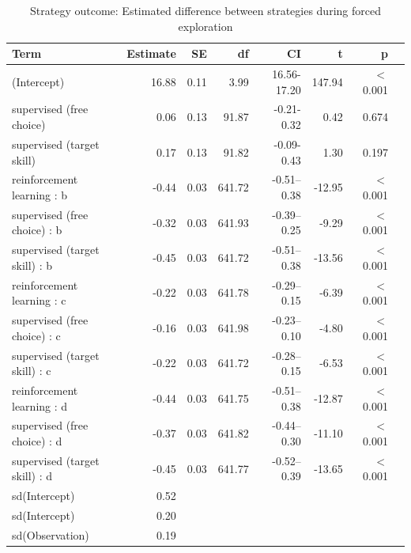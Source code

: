 \documentclass[pdflatex,sn-mathphys-num]{sn-jnl}%
\theoremstyle{thmstyleone}%
\theoremstyle{thmstyletwo}%
\theoremstyle{thmstylethree}%
\begin{document}
\begin{appendices}
\begin{table}[h!]
\caption{Strategy outcome: Estimated difference between strategies during forced exploration}\label{table_strategyoutcome_diffstrategy}
\centering
\begin{tabular}{lrrrrrrr}
  \hline
Term & Estimate & SE & df & CI & t & p \\ 
  \hline
 (Intercept) & 16.88 & 0.11 & 3.99 & 16.56-17.20 & 147.94 &  $<$  0.001 \\ 
  supervised (free choice) & 0.06 & 0.13 & 91.87 & -0.21-0.32 & 0.42 &    0.674 \\ 
   supervised (target skill) & 0.17 & 0.13 & 91.82 & -0.09-0.43 & 1.30 &    0.197 \\ 
   reinforcement learning : b & -0.44 & 0.03 & 641.72 & -0.51--0.38 & -12.95 &  $<$  0.001 \\ 
  supervised (free choice) : b & -0.32 & 0.03 & 641.93 & -0.39--0.25 & -9.29 &  $<$  0.001 \\ 
   supervised (target skill) : b & -0.45 & 0.03 & 641.72 & -0.51--0.38 & -13.56 &  $<$  0.001 \\ 
  reinforcement learning : c & -0.22 & 0.03 & 641.78 & -0.29--0.15 & -6.39 &  $<$  0.001 \\ 
  supervised (free choice) : c & -0.16 & 0.03 & 641.98 & -0.23--0.10 & -4.80 &  $<$  0.001 \\ 
  supervised (target skill) : c & -0.22 & 0.03 & 641.72 & -0.28--0.15 & -6.53 &  $<$  0.001 \\ 
  reinforcement learning : d & -0.44 & 0.03 & 641.75 & -0.51--0.38 & -12.87 &  $<$  0.001 \\ 
  supervised (free choice) : d & -0.37 & 0.03 & 641.82 & -0.44--0.30 & -11.10 &  $<$  0.001 \\ 
  supervised (target skill) : d & -0.45 & 0.03 & 641.77 & -0.52--0.39 & -13.65 &  $<$  0.001 \\ 
  sd(Intercept) & 0.52 &  &  &  &  &  \\ 
  sd(Intercept) & 0.20 &  &  &  &  &   \\ 
  sd(Observation) & 0.19 &  &  &  &  &   \\ 
   \hline
\end{tabular}
\end{table}





\end{appendices}
\end{document}

